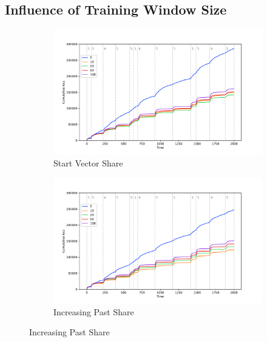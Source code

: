 \documentclass[12pt, twoside]{article}
\begin{document}
\newpage

\subsection{Influence of Training Window Size}

\begin{figure}[htb]
    \centering %
\begin{subfigure}{0.5\textwidth}
  \includegraphics[width=\linewidth]{diff_tw_s}
  \caption{Start Vector Share}
  \label{fig:tw_s}
\end{subfigure}\hfil %
\begin{subfigure}{0.5\textwidth}
  \includegraphics[width=\linewidth]{diff_tw_i}
  \caption{Increasing Past Share}
  \label{fig:tw_i}
\end{subfigure}\hfil %



\end{figure}
\end{document}
